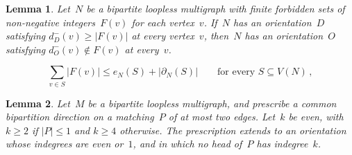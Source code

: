\documentclass[10pt,a4paper]{amsart}
\newtheorem{lemma}{Lemma}
\begin{document}
\begin{lemma}\label{lem:lists} 
  Let~$N$ be a bipartite loopless multigraph with finite forbidden sets of
  non-negative integers~$F(v)$ for each vertex~$v$.
  If~$N$ has an orientation~$D$ satisfying $d^-_D(v) \ge |F(v)|$ at every
  vertex~$v$, then~$N$ has an orientation~$O$ satisfying $d^-_O(v) \notin F(v)$
  at every~$v$.
\end{lemma}

\begin{equation}\label{eq:hall}
  \sum_{v \in S} |F(v)| \le e_N(S) + |\partial_N(S)|
    \qquad\text{for every }S \subseteq V(N) \, ,
\end{equation}

\begin{lemma}\label{lem:marked}
  Let~$M$ be a bipartite loopless multigraph, and prescribe a common
  bipartition direction on a matching~$P$ of at most two edges.
  Let~$k$ be even, with $k \ge 2$ if $|P| \le 1$ and $k \ge 4$ otherwise.
  The prescription extends to an orientation whose indegrees are even or~$1$,
  and in which no head of~$P$ has indegree~$k$.
\end{lemma}
\end{document}
